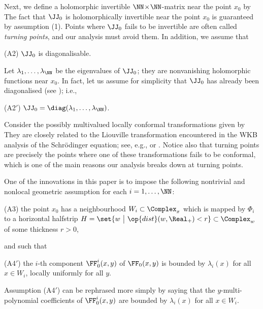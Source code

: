 \documentclass[11pt]{article}
\begin{document}
Next, we define a holomorphic invertible $\NN\!\times\!\NN$-matrix near the point $x_0$ by
\vspace{-7.5pt}
The fact that $\JJ_0$ is holomorphically invertible near the point $x_0$ is guaranteed by assumption (1).
Points where $\JJ_0$ fails to be invertible are often called \textit{turning points}, and our analysis must avoid them.
In addition, we assume that
\begin{itemise}
\item [(A2)] $\JJ_0$ is diagonalisable.
\end{itemise}
Let $\lambda_1, \ldots, \lambda_\NN$ be the eigenvalues of $\JJ_0$; they are nonvanishing holomorphic functions near $x_0$.
In fact, let us assume for simplicity that $\JJ_0$ has already been diagonalised (see ); i.e.,
\begin{itemise}
\item [(A2${}'$)] $\JJ_0 = \diag (\lambda_1, \ldots, \lambda_\NN)$.
\end{itemise}

Consider the possibly multivalued locally conformal transformations given by
They are closely related to the Liouville transformation encountered in the WKB analysis of the Schrödinger equation; see, e.g., \cite[§4.1]{MY210623112236} or \cite[§6.1]{MR1429619}.
Notice also that turning points are precisely the points where one of these transformations fails to be conformal, which is one of the main reasons our analysis breaks down at turning points.

One of the innovations in this paper is to impose the following nontrivial and nonlocal geometric assumption for each $i = 1, \ldots, \NN$:
\begin{itemise}
\item [(A3)] the point $x_0$ has a neighbourhood $W_i \subset \Complex_x$ which is mapped by $\Phi_i$ to a horizontal halfstrip $H = \set{w ~\big|~ \op{dist} (w, \Real_+) < r} \subset \Complex_w$ of some thickness $r > 0$,
\end{itemise}
and such that
\begin{itemise}
\item [(A4${}'$)] the $i$-th component $\FF^i_0 (x, y)$ of $\FF_0 (x, y)$ is bounded by $\lambda_i (x)$ for all $x \in W_i$, locally uniformly for all $y$.
\end{itemise}
Assumption (A4${}'$) can be rephrased more simply by saying that the $y$-multi-polynomial coefficients of $\FF^i_0 (x, y)$ are bounded by $\lambda_i (x)$ for all $x \in W_i$.
\end{document}
